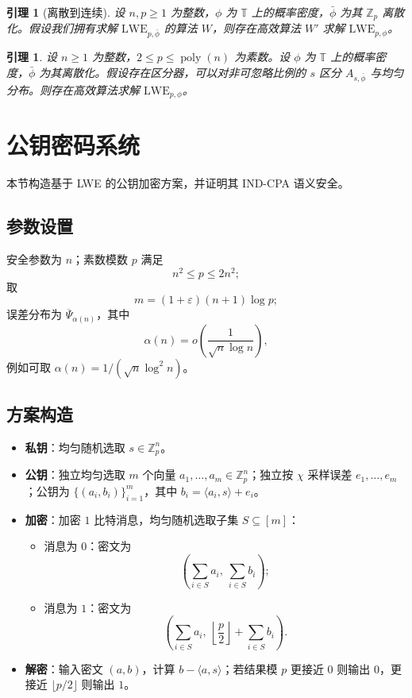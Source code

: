 \documentclass[11pt,a4paper]{article}
\newtheorem{lemma}[theorem]{引理}
\DeclareMathOperator{\poly}{poly}
\newcommand{\T}{\mathbb{T}}
\newcommand{\Z}{\mathbb{Z}}
\newcommand{\Psibar}{\overline{\Psi}}
\begin{document}
\begin{lemma}[离散到连续]
设 $n,p\ge 1$ 为整数，$\phi$ 为 $\T$ 上的概率密度，$\bar{\phi}$ 为其 $\Z_{p}$ 离散化。假设我们拥有求解 $\mathrm{LWE}_{p,\bar{\phi}}$ 的算法 $W$，则存在高效算法 $W'$ 求解 $\mathrm{LWE}_{p,\phi}$。
\end{lemma}

\begin{lemma}
设 $n\ge 1$ 为整数，$2\le p\le\poly(n)$ 为素数。设 $\phi$ 为 $\T$ 上的概率密度，$\bar{\phi}$ 为其离散化。假设存在区分器，可以对非可忽略比例的 $s$ 区分 $A_{s,\bar{\phi}}$ 与均匀分布。则存在高效算法求解 $\mathrm{LWE}_{p,\phi}$。
\end{lemma}

\section{公钥密码系统}

本节构造基于 LWE 的公钥加密方案，并证明其 IND-CPA 语义安全。

\subsection{参数设置}

安全参数为 $n$；素数模数 $p$ 满足
\[
  n^{2}\le p\le 2n^{2};
\]
取
\[
  m=(1+\varepsilon)(n+1)\log p;
\]
误差分布为 $\Psibar_{\alpha(n)}$，其中
\[
  \alpha(n)=o\!\left(\frac{1}{\sqrt{n}\log n}\right),
\]
例如可取 $\alpha(n)=1/(\sqrt{n}\log^{2}n)$。

\subsection{方案构造}

\begin{itemize}[leftmargin=2em]
  \item \textbf{私钥}：均匀随机选取 $s\in\Z_{p}^{n}$。
  \item \textbf{公钥}：独立均匀选取 $m$ 个向量 $a_{1},\dots,a_{m}\in\Z_{p}^{n}$；独立按 $\chi$ 采样误差 $e_{1},\dots,e_{m}$；公钥为 $\{(a_{i},b_{i})\}_{i=1}^{m}$，其中 $b_{i}=\langle a_{i},s\rangle+e_{i}$。
  \item \textbf{加密}：加密 $1$ 比特消息，均匀随机选取子集 $S\subseteq[m]$：
  \begin{itemize}
    \item 消息为 $0$：密文为
    \[
      \left(\sum_{i\in S}a_{i},\ \sum_{i\in S}b_{i}\right);
    \]
    \item 消息为 $1$：密文为
    \[
      \left(\sum_{i\in S}a_{i},\ \left\lfloor\frac{p}{2}\right\rfloor+\sum_{i\in S}b_{i}\right).
    \]
  \end{itemize}
  \item \textbf{解密}：输入密文 $(a,b)$，计算 $b-\langle a,s\rangle$；若结果模 $p$ 更接近 $0$ 则输出 $0$，更接近 $\lfloor p/2\rfloor$ 则输出 $1$。
\end{itemize}
\end{document}
